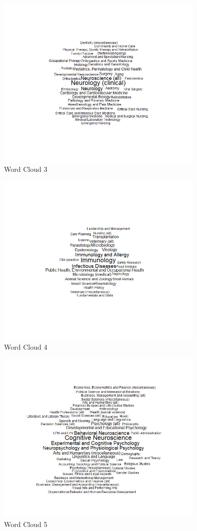 \documentclass[a4paper,11pt]{article}
\theoremstyle{mytheor}
\begin{document}
\begin{figure}[!htb]
    \centering
    \includegraphics[width=10cm]{3.jpeg}
    \caption{Word Cloud 3}
    \label{fig:galaxy}
\end{figure}

\begin{figure}[!htb]
    \centering
    \includegraphics[width=10cm]{4.jpeg}
    \caption{Word Cloud 4}
    \label{fig:galaxy}
\end{figure}

\begin{figure}[!htb]
    \centering
    \includegraphics[width=10cm]{5.jpeg}
    \caption{Word Cloud 5}
    \label{fig:galaxy}
\end{figure}
\end{document}
